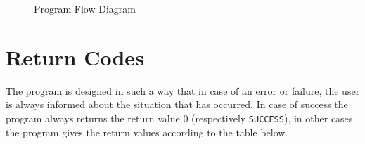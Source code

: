 \documentclass[a4paper,11pt]{article}
\begin{document}
\begin{figure}[H]
    \centering
    \caption{Program Flow Diagram}
    \label{figure:imap-clients}
\end{figure}

\newpage

\section{Return Codes}
The program is designed in such a way that in case of an error or failure, the user 
is always informed about the situation that has occurred. In case of success the program 
always returns the return value 0 (respectively \verb!SUCCESS!), in other cases the program gives the return 
values according to the table below.
\end{document}
